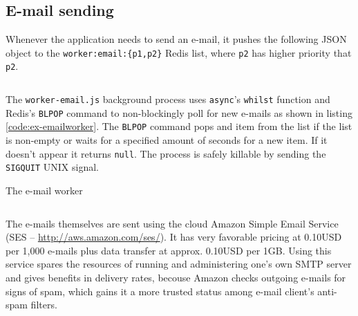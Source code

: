 \documentclass[12pt,oneside]{fithesis}
\begin{document}
	\subsection{E-mail sending}
		\label{section:email}
		Whenever the application needs to send an e-mail, it pushes the following JSON object to the \texttt{worker:email:\{p1,p2\}} Redis list, where \texttt{p2} has higher priority that \texttt{p2}.
		\inputminted[fontsize=\footnotesize, linenos=false]{javascript}{ex-emailobj.js}
		
		The \texttt{worker-email.js} background process uses \texttt{async}'s \texttt{whilst} function and Redis's \texttt{BLPOP} command to non-blockingly poll for new e-mails as shown in listing \ref{code:ex-emailworker}. The \texttt{BLPOP} command pops and item from the list if the list is non-empty or waits for a specified amount of seconds for a new item. If it doesn't appear it returns \texttt{null}. The process is safely killable by sending the \texttt{SIGQUIT} UNIX signal.
		
		\begin{program}[h]
		\caption{The e-mail worker}
		\label{code:ex-emailworker}
		\inputminted[fontsize=\footnotesize, linenos=false]{javascript}{ex-emailworker.js}
		\end{program}
		
		The e-mails themselves are sent using the cloud Amazon Simple Email Service (SES -- \url{http://aws.amazon.com/ses/}). It has very favorable pricing at 0.10USD per 1,000 e-mails plus data transfer at approx. 0.10USD per 1GB. Using this service spares the resources of running and administering one's own SMTP server and gives benefits in delivery rates, becouse Amazon checks outgoing e-mails for signs of spam, which gains it a more trusted status among e-mail client's anti-spam  filters.
\end{document}
